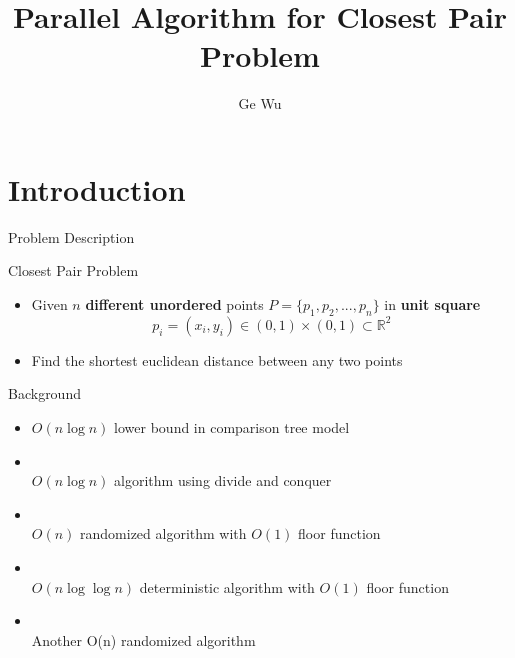 \documentclass[18pt]{beamer}
\title[Parallel Algorithm for Closest Pair Problem]{Parallel Algorithm for Closest Pair Problem}
\subtitle{}
\author{Ge Wu}
\institute{Institute for Theoretical Informatics}
\def \loose {15pt}
\begin{document}
\def\sh{\texttt{\#}}
\def\pl{\texttt{+}}
\def\mi{\texttt{-}}
\def\at{\text{@}}


\begin{frame}
\titlepage
\end{frame}


\section{Introduction}

\begin{frame}{Problem Description}
\begin{block}{Closest Pair Problem}
\begin{itemize}
\item Given $n$ \textbf{different unordered} points $P = \{p_1,p_2, ... ,p_n\}$ in \textbf{unit square} \\
$$p_i = (x_i, y_i) \in (0, 1) \times (0,1) \subset \mathbb{R}^2$$
\item Find the shortest euclidean distance between any two points
\end{itemize}
\end{block}
\end{frame}

\begin{frame}{Background}
\begin{itemize}
	\setlength{\itemsep}{\loose}
	\item $O(n \log n)$ lower bound in comparison tree model
	\item \textbf{\cite{Bentley:1976:DMS:800113.803652}} \\
		$O(n\log n)$ algorithm using divide and conquer
	\item \textbf{\cite{major}}\\ \alert{$O(n)$ randomized algorithm with $O(1)$ floor function}
 	\item \textbf{\cite{fortune1978note}} \\ $O(n \log \log n)$ deterministic algorithm with $O(1)$ floor function
 	\item \textbf{\cite{khuller1995simple}} \\ Another O(n) randomized algorithm
\end{itemize}
\end{frame}
\end{document}
